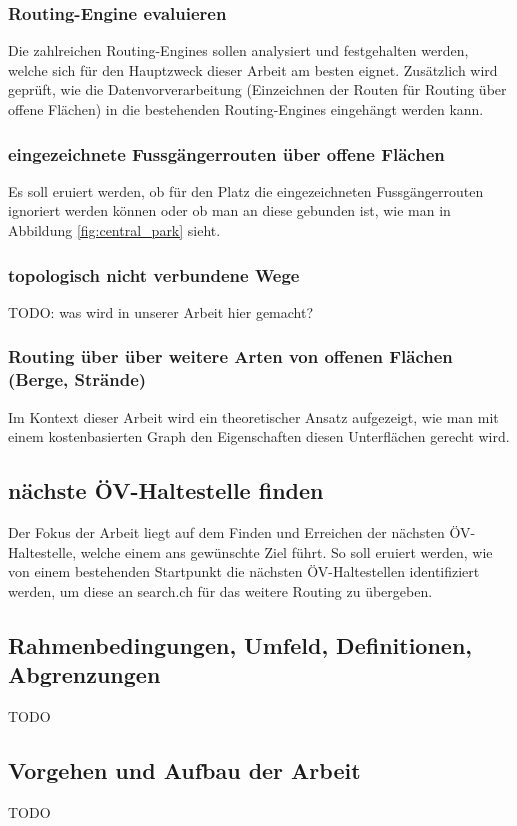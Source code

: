 \subsubsection{Routing-Engine evaluieren}
\label{subsub:Ziel Routing-Enginge evaluieren}
Die zahlreichen Routing-Engines sollen analysiert und festgehalten werden, welche sich für den Hauptzweck dieser Arbeit am besten eignet. Zusätzlich wird geprüft, wie die Datenvorverarbeitung (Einzeichnen der Routen für Routing über offene Flächen) in die bestehenden Routing-Engines eingehängt werden kann. 

\subsubsection{eingezeichnete Fussgängerrouten über offene Flächen}
\label{subsub:Ziel eingezeichnete Fussgängerrouten über offene Flächen}
Es soll eruiert werden, ob für den Platz die eingezeichneten Fussgängerrouten ignoriert werden können oder ob man an diese gebunden ist, wie man in Abbildung \ref{fig:central_park} sieht.

\subsubsection{topologisch nicht verbundene Wege}
\label{Ziel subsub:topologisch nicht verbundene Wege}
TODO: was wird in unserer Arbeit hier gemacht?

\subsubsection{Routing über über weitere Arten von offenen Flächen (Berge, Strände)}
\label{subsub:Ziel Routing über über weitere Arten von offenen Flächen (Berge, Strände)}
Im Kontext dieser Arbeit wird ein theoretischer Ansatz aufgezeigt, wie man mit einem kostenbasierten Graph den Eigenschaften diesen Unterflächen gerecht wird.

\subsection{nächste ÖV-Haltestelle finden}
\label{subsub:Ziel nächste ÖV-Haltestelle finden}
Der Fokus der Arbeit liegt auf dem Finden und Erreichen der nächsten ÖV-Haltestelle, welche einem ans gewünschte Ziel führt. So soll eruiert werden, wie von einem bestehenden Startpunkt die nächsten ÖV-Haltestellen identifiziert werden, um diese an search.ch für das weitere Routing zu übergeben.
	
\subsection{Rahmenbedingungen, Umfeld, Definitionen, Abgrenzungen}
\label{sub:Rahmenbedingungen, Umfeld, Definitionen, Abgrenzungen}
TODO

\subsection{Vorgehen und Aufbau der Arbeit}
\label{sub:Vorgehen und Aufbau der Arbeit}
TODO
